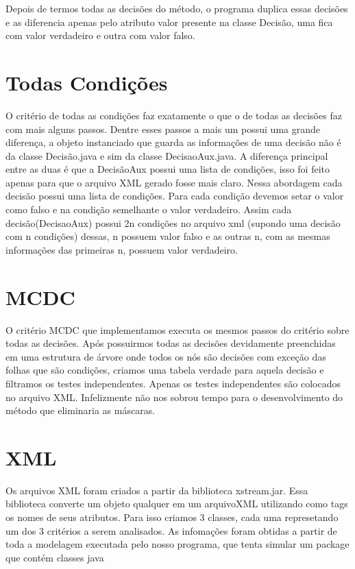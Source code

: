 \documentclass[12pt]{article} %
\begin{document}
	Depois de termos todas as decisões do método, o programa duplica essas decisões e as diferencia apenas pelo atributo valor presente na classe
Decisão, uma fica com valor verdadeiro e outra com valor falso. 

\newpage

\section{Todas Condições}
\mbox{}

	O critério de todas as condições faz exatamente o que o de todas as decisões faz com mais alguns passos. Dentre esses passos a mais um 
possui uma grande diferença, a objeto instanciado que guarda as informações de uma decisão não é da classe Decisão.java e sim da classe 
DecisaoAux.java. A diferença principal entre as duas é que a DecisãoAux possui uma lista de condições, isso foi feito apenas para que o arquivo 
XML gerado fosse mais claro. Nessa abordagem cada decisão possui uma lista de condições. Para cada condição devemos setar o valor como falso
e na condição semelhante o valor verdadeiro. Assim cada decisão(DecisaoAux) possui 2n condições no arquivo xml (supondo uma decisão com n condições) dessas, n possuem valor falso e as outras n, com as mesmas informações das primeiras n, possuem valor verdadeiro. 

\section{MCDC}
\mbox{}

	O critério MCDC que implementamos executa os mesmos passos do critério sobre todas as decisões. Após possuirmos todas as decisões
devidamente preenchidas em uma estrutura de árvore onde todos os nós são decisões com exceção das folhas que são condições, criamos uma tabela verdade para aquela decisão e filtramos os testes independentes. Apenas os testes independentes são colocados no arquivo XML. Infelizmente não nos sobrou tempo para o desenvolvimento do método que eliminaria as máscaras. 

\section{XML}
\mbox{}

	Os arquivos XML foram criados a partir da biblioteca xstream.jar. Essa biblioteca converte um objeto qualquer em um arquivoXML utilizando como 
tags os nomes de seus atributos. Para isso criamos 3 classes, cada uma represetando um dos 3 critérios a serem analisados. As infomações foram obtidas a partir de toda a modelagem executada pelo nosso programa, que tenta simular um package que contém classes java
\end{document}
